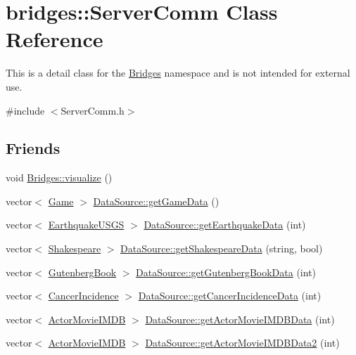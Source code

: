 \hypertarget{classbridges_1_1_server_comm}{}\section{bridges\+:\+:Server\+Comm Class Reference}
\label{classbridges_1_1_server_comm}


This is a detail class for the \hyperlink{namespacebridges_1_1_bridges}{Bridges} namespace and is not intended for external use.  




{\ttfamily \#include $<$Server\+Comm.\+h$>$}

\subsection*{Friends}
\begin{DoxyCompactItemize}
\item 
void \hyperlink{classbridges_1_1_server_comm_a0a9e3be9faab475909293766dcda4779}{Bridges\+::visualize} ()
\item 
vector$<$ \hyperlink{classbridges_1_1_game}{Game} $>$ \hyperlink{classbridges_1_1_server_comm_aaf9715981dcd976f93624bd3aa22183f}{Data\+Source\+::get\+Game\+Data} ()
\item 
vector$<$ \hyperlink{classbridges_1_1_earthquake_u_s_g_s}{Earthquake\+U\+S\+G\+S} $>$ \hyperlink{classbridges_1_1_server_comm_a29b51cd765158c2022cdf624302a6f41}{Data\+Source\+::get\+Earthquake\+Data} (int)
\item 
vector$<$ \hyperlink{classbridges_1_1_shakespeare}{Shakespeare} $>$ \hyperlink{classbridges_1_1_server_comm_a1f240eea3d39812606c0b3d10bdc757c}{Data\+Source\+::get\+Shakespeare\+Data} (string, bool)
\item 
vector$<$ \hyperlink{classbridges_1_1_gutenberg_book}{Gutenberg\+Book} $>$ \hyperlink{classbridges_1_1_server_comm_a8daad6bf2db8bf4f0b0f9914022b6aa4}{Data\+Source\+::get\+Gutenberg\+Book\+Data} (int)
\item 
vector$<$ \hyperlink{classbridges_1_1_cancer_incidence}{Cancer\+Incidence} $>$ \hyperlink{classbridges_1_1_server_comm_a206da9499372409063d2abe5d1e9bce0}{Data\+Source\+::get\+Cancer\+Incidence\+Data} (int)
\item 
vector$<$ \hyperlink{classbridges_1_1_actor_movie_i_m_d_b}{Actor\+Movie\+I\+M\+D\+B} $>$ \hyperlink{classbridges_1_1_server_comm_aeea4f9e05ded118d657ac8ba9e66f22d}{Data\+Source\+::get\+Actor\+Movie\+I\+M\+D\+B\+Data} (int)
\item 
vector$<$ \hyperlink{classbridges_1_1_actor_movie_i_m_d_b}{Actor\+Movie\+I\+M\+D\+B} $>$ \hyperlink{classbridges_1_1_server_comm_a9f693b301b5f883a818914b1f0a8c20f}{Data\+Source\+::get\+Actor\+Movie\+I\+M\+D\+B\+Data2} (int)
\end{DoxyCompactItemize}



